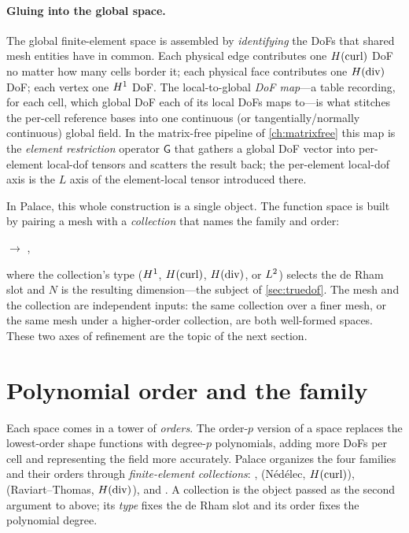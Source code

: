 \paragraph{Gluing into the global space.} The global finite-element space is assembled by
\emph{identifying} the DoFs that shared mesh entities have in common. Each physical edge
contributes one $H(\mathrm{curl})$ DoF no matter how many cells border it; each physical face
contributes one $H(\mathrm{div})$ DoF; each vertex one $H^1$ DoF. The local-to-global \emph{DoF
map}---a table recording, for each cell, which global DoF each of its local DoFs maps
to---is what stitches the per-cell reference bases into one continuous (or
tangentially/normally continuous) global field. In the matrix-free pipeline of
\cref{ch:matrixfree} this map is the \emph{element restriction} operator $\mathsf{G}$ that
gathers a global DoF vector into per-element local-dof tensors and scatters the result
back; the per-element local-dof axis is the $L$ axis of the element-local tensor
introduced there.

In Palace, this whole construction is a single object. The function space is built by
pairing a mesh with a \emph{collection} that names the family and order:
\begin{center}
 $\longrightarrow$
,
\end{center}
where the collection's type ($H^1$, $H(\mathrm{curl})$, $H(\mathrm{div})$, or $L^2$) selects the de Rham
slot and $N$ is the resulting dimension---the subject of \cref{sec:truedof}. The mesh and
the collection are independent inputs: the same collection over a finer mesh, or the same
mesh under a higher-order collection, are both well-formed spaces. These two axes of
refinement are the topic of the next section.

\section{Polynomial order and the  family}

Each space comes in a tower of \emph{orders}. The order-$p$ version of a space replaces the
lowest-order shape functions with degree-$p$ polynomials, adding more DoFs per cell and
representing the field more accurately. Palace organizes the four families and their orders
through \emph{finite-element collections}: , 
(N\'ed\'elec, $H(\mathrm{curl})$),  (Raviart--Thomas, $H(\mathrm{div})$), and
. A collection is the object passed as the second argument to
 above; its \emph{type} fixes the de Rham slot and its order fixes the
polynomial degree.

